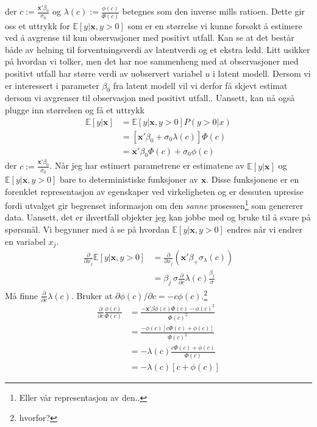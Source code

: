 der $c:=\frac{\mathbf{x}'\beta_0}{\sigma_0}$ og $\lambda(c):=\frac{\phi(c)}{\Phi(c)}$ betegnes som den inverse mills ratioen. Dette gir oss et uttrykk for $\mathbb{E}[y|\mathbf{x},y>0]$ som er en størrelse vi kunne forsøkt å estimere ved å avgrense til kun observasjoner med positivt utfall. Kan se at det består både av helning til forventningsverdi av latentverdi og et ekstra ledd. Litt usikker på hvordan vi tolker, men det har noe sammenheng med at observasjoner med positivt utfall har større verdi av uobservert variabel $u$ i latent modell. Dersom vi er interessert i parameter $\beta_0$ fra latent modell vil vi derfor få skjevt estimat dersom vi avgrenser til observasjon med positivt utfall.. Uansett, kan nå også plugge inn størrelsen og få et uttrykk 
\begin{align}
\mathbb{E}[y|\mathbf{x}] &= \mathbb{E}[y|\mathbf{x},y>0]P(y>0|x) \\
&=\left[\mathbf{x}'\beta_0 + \sigma_0\lambda(c)\right]\Phi(c) \\
&=\mathbf{x}'\beta_0\Phi(c)+\sigma_0\phi(c)
\end{align}
der $c:=\frac{\mathbf{x}'\beta_0}{\sigma_0}$. Når jeg har estimert parametrene er estimatene av $\mathbb{E}[y|\mathbf{x}]$ og $\mathbb{E}[y|\mathbf{x},y>0]$ bare to deterministiske funksjoner av $\mathbf{x}$. Disse funksjonene er en forenklet representasjon av egenskaper ved virkeligheten og er dessuten upresise fordi utvalget gir begrenset informasjon om den \textit{sanne} prosessen\footnote{Eller vår representasjon av den..} som genererer data. Uansett, det er ihvertfall objekter jeg kan jobbe med og bruke til å svare på spørsmål. Vi begynner med å se på hvordan $\mathbb{E}[y|\mathbf{x},y>0]$ endres når vi endrer en variabel $x_j$. 
\begin{align}
\frac{\partial}{\partial x_j} \mathbb{E}[y|\mathbf{x},y>0] &= \frac{\partial}{\partial x_j}(\mathbf{x}'\beta_ + \sigma_\lambda(c)) \\
  &= \beta_j \ \sigma\frac{\partial}{\partial c}\lambda(c)\frac{\beta_j}{\sigma}
\end{align}
Må finne $\frac{\partial}{\partial c}\lambda(c)$. Bruker at $\partial \phi(c) / \partial c = -c\phi(c)$.\footnote{hvorfor?}
\begin{align}
\frac{\partial}{\partial c}\frac{\phi(c)}{\Phi(c)} &= \frac{-\mathbf{x}'\beta\phi(c)\Phi(c)-\phi(c)^2}{\Phi(c)^2}  \\
&=\frac{-\phi(c)[c\Phi(c)+\phi(c)]}{\Phi(c)^2} \\
&=-\lambda(c)\frac{c\Phi(c)+\phi(c)}{\Phi(c)} \\
&=-\lambda(c)[c+\phi(c)]
\end{align}
